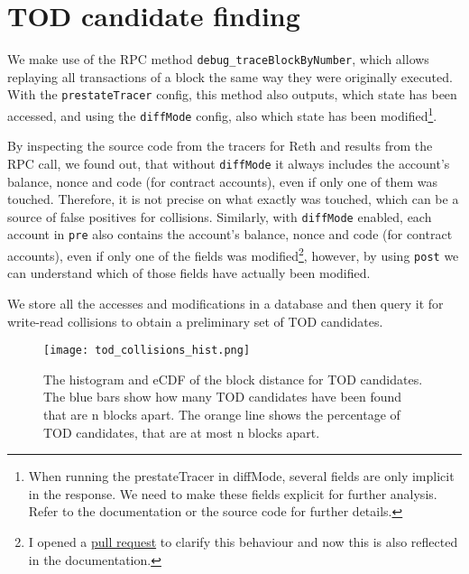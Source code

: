 \documentclass[draft,final]{vutinfth} %
\begin{document}
\section{TOD candidate finding}

We make use of the RPC method \verb|debug_traceBlockByNumber|, which allows replaying all transactions of a block the same way they were originally executed. With the \verb|prestateTracer| config, this method also outputs, which state has been accessed, and using the \verb|diffMode| config, also which state has been modified\footnote{When running the prestateTracer in diffMode, several fields are only implicit in the response. We need to make these fields explicit for further analysis. Refer to the documentation or the source code for further details.}.

By inspecting the source code from the tracers for Reth\cite{noauthor_paradigmxyzrevm-inspectors_2024} and results from the RPC call, we found out, that without \verb|diffMode| it always includes the account's balance, nonce and code (for contract accounts), even if only one of them was touched. Therefore, it is not precise on what exactly was touched, which can be a source of false positives for collisions. Similarly, with \verb|diffMode| enabled, each account in \verb|pre| also contains the account's balance, nonce and code (for contract accounts), even if only one of the fields was modified\footnote{I opened a \href{https://github.com/ethereum/go-ethereum/pull/30081}{pull request} to clarify this behaviour and now this is also reflected in the documentation\cite{noauthor_built-tracers_2024}.}, however, by using \verb|post| we can understand which of those fields have actually been modified.

We store all the accesses and modifications in a database and then query it for write-read collisions to obtain a preliminary set of TOD candidates.


\begin{figure}[h]
    \centering
    \texttt{[image: tod\_collisions\_hist.png]}
    \caption{The histogram and eCDF of the block distance for TOD candidates. The blue bars show how many TOD candidates have been found that are n blocks apart. The orange line shows the percentage of TOD candidates, that are at most n blocks apart.}
    \label{fig:tod_block_dist}
\end{figure}
\end{document}
